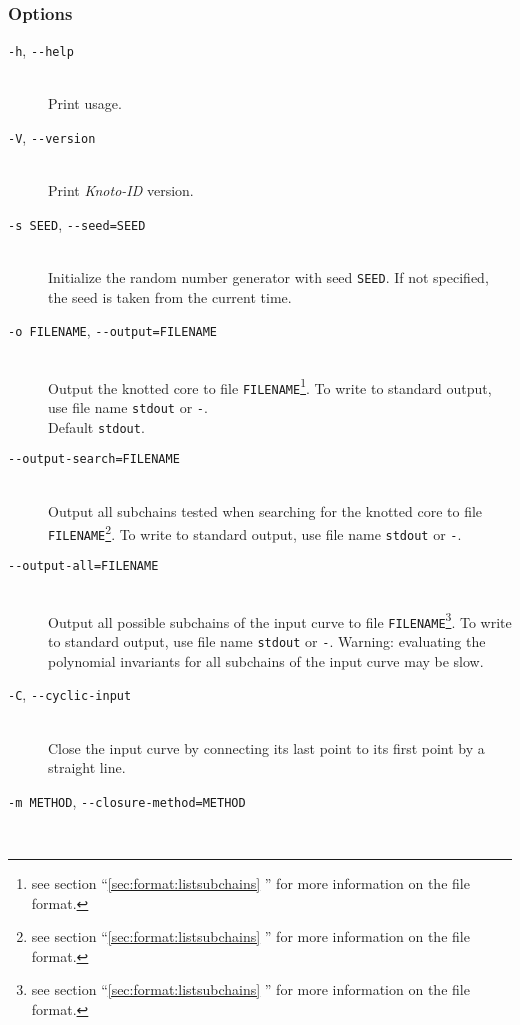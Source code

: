\subsubsection{Options}
\begin{description}
\item[\lstinline{-h}, \lstinline{--help}]\hfill\\
  Print usage.
\item[\lstinline{-V}, \lstinline{--version}]\hfill\\
  Print {\it Knoto-ID} version.
\item[\lstinline{-s SEED}, \lstinline{--seed=SEED}]\hfill\\
  Initialize the random number generator with  seed \lstinline{SEED}. If not specified, the seed is taken from the current time. 
\item[\lstinline{-o FILENAME}, \lstinline{--output=FILENAME}]\hfill\\
  Output the knotted core to file \lstinline{FILENAME}\footnote{see section ``\ref{sec:format:listsubchains} '' for more information on the file format.}.  To write to standard output, use file name \lstinline{stdout} or \lstinline{-}.\\
  Default \lstinline{stdout}.
\item[\lstinline{--output-search=FILENAME}]\hfill\\
  Output all subchains tested when searching for the knotted core to file \lstinline{FILENAME}\footnote{see section ``\ref{sec:format:listsubchains} '' for more information on the file format.}. To write to standard output, use file name \lstinline{stdout} or \lstinline{-}.
\item[\lstinline{--output-all=FILENAME}]\hfill\\
  Output all possible subchains of the input curve to file \lstinline{FILENAME}\footnote{see section ``\ref{sec:format:listsubchains} '' for more information on the file format.}. To write to standard output, use file name \lstinline{stdout} or \lstinline{-}. Warning: evaluating the polynomial invariants for all subchains of the input curve may be slow.
\item[\lstinline{-C}, \lstinline{--cyclic-input}]\hfill\\
  Close the input curve by connecting its last point to its first point by a straight line.  
\item[\lstinline{-m METHOD}, \lstinline{--closure-method=METHOD}]\hfill\\

\end{description}
